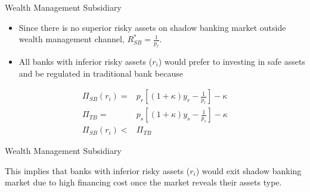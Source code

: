 \documentclass[
  ignorenonframetext,
]{beamer}
\begin{document}
\begin{frame}{Wealth Management Subsidiary}
\protect\hypertarget{wealth-management-subsidiary-2}{}

\begin{itemize}
\item
  Since there is no superior risky assets on shadow banking market
  outside wealth management channel, \(R^*_{SB}=\frac{1}{p_{r}}\).
\item
  All banks with inferior risky assets (\(r_{i}\)) would prefer to
  investing in safe assets and be regulated in traditional bank because
\end{itemize}

\[
\begin{align*}
\Pi_{SB}(r_{i})=&p_{r}[(1+\kappa)y_{r}-\frac{1}{p_{r}}]-\kappa\\
\Pi_{TB}=&p_{s}[(1+\kappa)y_{s}-\frac{1}{p_{s}}]-\kappa\\
\Pi_{SB}(r_{i})< &\Pi_{TB}
\end{align*}
\]

\end{frame}

\begin{frame}{Wealth Management Subsidiary}
\protect\hypertarget{wealth-management-subsidiary-3}{}

This implies that banks with inferior risky assets (\(r_{i}\)) would
exit shadow banking market due to high financing cost once the market
reveals their assets type.

\end{frame}
\end{document}
